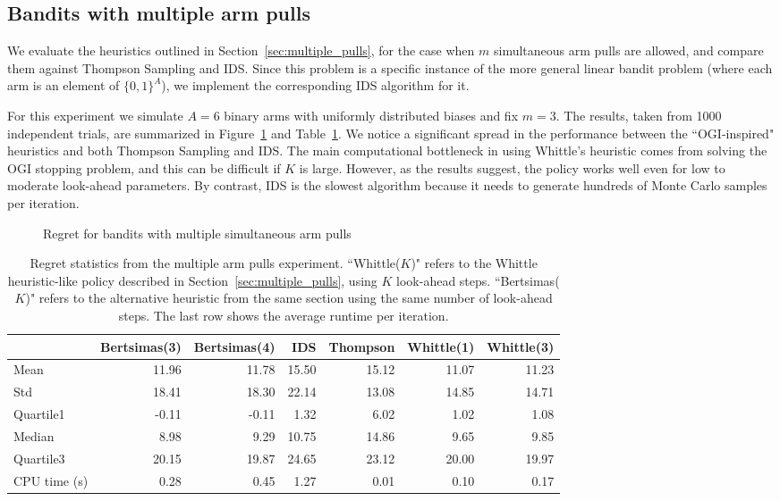 \subsection{Bandits with multiple arm pulls}
We evaluate the heuristics outlined in Section~\ref{sec:multiple_pulls}, for the case when $m$ simultaneous arm pulls are allowed, and compare them against Thompson Sampling and IDS. Since this problem is a specific instance of the more general linear bandit problem (where each arm is an element of $\{0,1\}^A$), we implement the corresponding IDS algorithm for it.

For this experiment we simulate $A = 6$ binary arms with uniformly distributed biases and fix $m =3$. The results, taken from 1000 independent trials, are summarized in Figure~\ref{fig:restless1} and Table~\ref{table:restless1_summary}. We notice a significant spread in the performance between the ``OGI-inspired" heuristics and both Thompson Sampling and IDS. The main computational bottleneck in using Whittle's heuristic comes from solving the OGI stopping problem, and this can be difficult if $K$ is large. However, as the results suggest, the policy works well even for low to moderate look-ahead parameters. By contrast, IDS is the slowest algorithm because it needs to generate hundreds of Monte Carlo samples per iteration.
\begin{figure}
	\centering
	
	\caption{Regret for bandits with multiple simultaneous arm pulls}
	\label{fig:restless1}
\end{figure}

\begin{table}
	\centering
	\begin{tabular}{lrrrrrr}
		\toprule
		{} &  Bertsimas(3) &  Bertsimas(4) &   IDS &  Thompson &  Whittle(1) &  Whittle(3) \\
		\midrule
		Mean      &         11.96 &         11.78 & 15.50 &     15.12 &       11.07 &       11.23 \\
		Std       &         18.41 &         18.30 & 22.14 &     13.08 &       14.85 &       14.71 \\
		Quartile1 &         -0.11 &         -0.11 &  1.32 &      6.02 &        1.02 &        1.08 \\
		Median    &          8.98 &          9.29 & 10.75 &     14.86 &        9.65 &        9.85 \\
		Quartile3 &         20.15 &         19.87 & 24.65 &     23.12 &       20.00 &       19.97 \\
		CPU time (s)  &          0.28 &          0.45 &  1.27 &      0.01 &        0.10 &        0.17 \\
		\bottomrule
	\end{tabular}
	
	\caption{Regret statistics from the multiple arm pulls experiment. ``Whittle($K$)" refers to the Whittle heuristic-like policy described in Section~\ref{sec:multiple_pulls}, using $K$ look-ahead steps. ``Bertsimas($K$)" refers to the alternative heuristic from the same section using the same number of look-ahead steps. The last row shows the average runtime per iteration.}
	\label{table:restless1_summary}
\end{table}